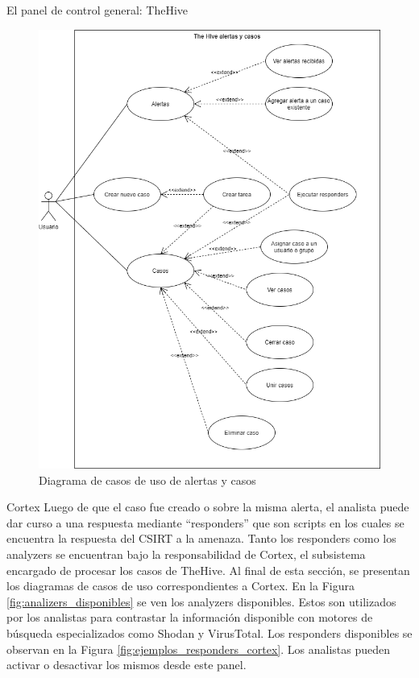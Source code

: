 \begin{section}{El panel de control general: TheHive }
\begin{figure}[H]
        \includegraphics[width=1\textwidth]{./descripcion_sonion_imagenes/figura_29_thehive_alertas_casos.png}
        \caption{Diagrama de casos de uso de alertas y casos}
        \label{fig:caso_de_uso_alertas_casos}
     \end{figure}
     \pagebreak
     \begin{subsection}{Cortex}
        Luego de que el caso fue creado o sobre la misma alerta, el analista puede dar curso a una respuesta mediante “responders” que son scripts en los cuales se encuentra la respuesta del CSIRT a la amenaza. Tanto los responders como los analyzers se encuentran bajo la responsabilidad de Cortex, el subsistema encargado de procesar los casos de TheHive. Al final de esta sección, se presentan los diagramas de casos de uso correspondientes a Cortex.
        En la Figura \ref{fig:analizers_disponibles} se ven los analyzers disponibles. Estos son utilizados por los analistas para contrastar la información disponible con motores de búsqueda especializados como Shodan y VirusTotal. Los responders disponibles se observan en la Figura \ref{fig:ejemplos_responders_cortex}. Los analistas pueden activar o desactivar los mismos desde este panel.

\end{subsection}
\end{section}
